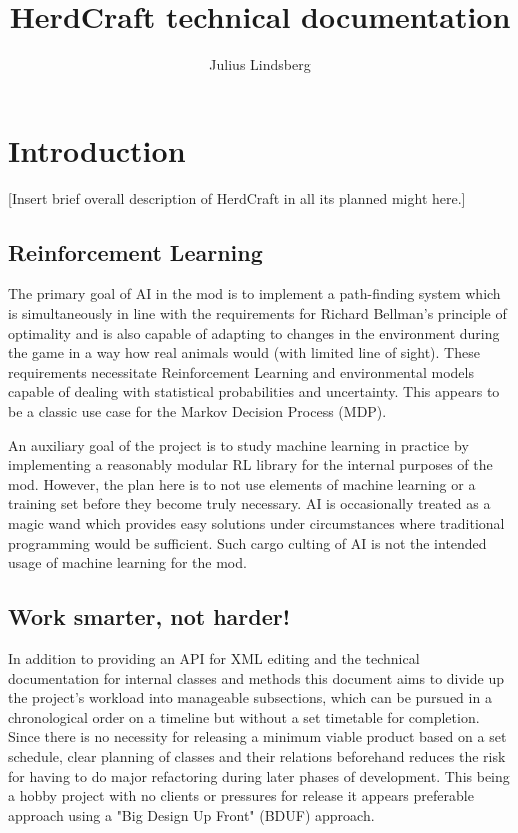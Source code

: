 \documentclass[]{article}
\title{HerdCraft technical documentation}
\author{Julius Lindsberg}
\begin{document}
\maketitle
\tableofcontents
\newpage

\section{Introduction}

[Insert brief overall description of HerdCraft in all its planned might here.]

\subsection{Reinforcement Learning}

The primary goal of AI in the mod is to implement a path-finding system which is simultaneously in line with the requirements for Richard Bellman's principle of optimality and is also capable of adapting to changes in the environment during the game in a way how real animals would (with limited line of sight). These requirements necessitate Reinforcement Learning and environmental models capable of dealing with statistical probabilities and uncertainty. This appears to be a classic use case for the Markov Decision Process (MDP).

An auxiliary goal of the project is to study machine learning in practice by implementing a reasonably modular RL library for the internal purposes of the mod. However, the plan here is to not use elements of machine learning or a training set before they become truly necessary. AI is occasionally treated as a magic wand which provides easy solutions under circumstances where traditional programming would be sufficient. Such cargo culting of AI is not the intended usage of machine learning for the mod.

\subsection{Work smarter, not harder!}

In addition to providing an API for XML editing and the technical documentation for internal classes and methods this document aims to divide up the project's workload into manageable subsections, which can be pursued in a chronological order on a timeline but without a set timetable for completion. Since there is no necessity for releasing a minimum viable product based on a set schedule, clear planning of classes and their relations beforehand reduces the risk for having to do major refactoring during later phases of development. This being a hobby project with no clients or pressures for release it appears preferable approach using a "Big Design Up Front" (BDUF) approach.
\end{document}
